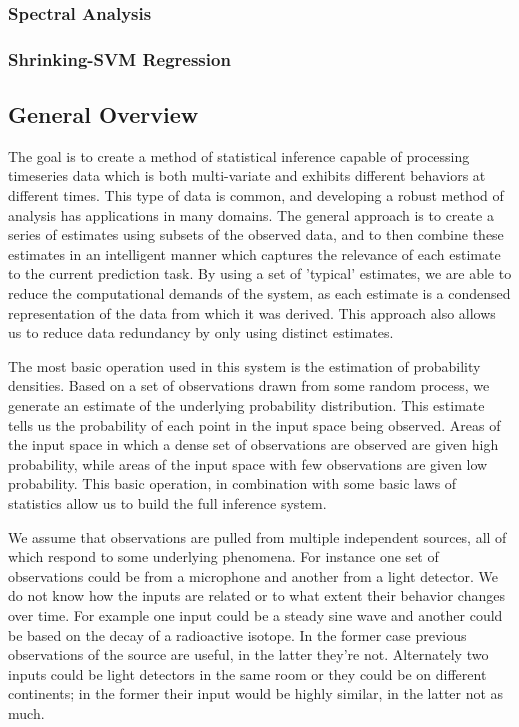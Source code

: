 \documentclass[10pt]{article}
\begin{document}
\subsubsection{Spectral Analysis}

\subsubsection{Shrinking-\epsilon SVM Regression}


\subsection{General Overview}
The goal is to create a method of statistical inference capable of processing timeseries data which is both multi-variate and exhibits different behaviors at different times.  This type of data is common, and developing a robust method of analysis has applications in many domains.  The general approach is to create a series of estimates using subsets of the observed data, and to then combine these estimates in an intelligent manner which captures the relevance of each estimate to the current prediction task.  By using a set of 'typical' estimates, we are able to reduce the computational demands of the system, as each estimate is a condensed representation of the data from which it was derived.  This approach also allows us to reduce data redundancy by only using distinct estimates.

The most basic operation used in this system is the estimation of probability densities.  Based on a set of observations drawn from some random process, we generate an estimate of the underlying probability distribution.  This estimate tells us the probability of each point in the input space being observed.  Areas of the input space in which a dense set of observations are observed are given high probability, while areas of the input space with few observations are given low probability.  This basic operation, in combination with some basic laws of statistics allow us to build the full inference system.

We assume that observations are pulled from multiple independent sources, all of which respond to some underlying phenomena.  For instance one set of observations could be from a microphone and another from a light detector.  We do not know how the inputs are related or to what extent their behavior changes over time.  For example one input could be a steady sine wave and another could be based on the decay of a radioactive isotope.  In the former case previous observations of the source are useful, in the latter they're not.  Alternately two inputs could be light detectors in the same room or they could be on different continents; in the former their input would be highly similar, in the latter not as much.
\end{document}
